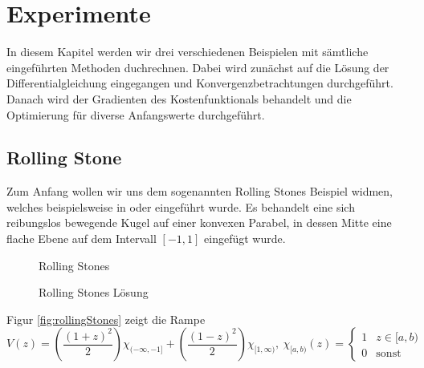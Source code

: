 \chapter{Experimente}
In diesem Kapitel werden wir drei verschiedenen Beispielen mit sämtliche eingeführten Methoden duchrechnen. Dabei wird zunächst auf die Lösung der Differentialgleichung eingegangen und Konvergenzbetrachtungen durchgeführt. Danach wird der Gradienten des Kostenfunktionals behandelt und die Optimierung für diverse Anfangswerte durchgeführt. %
\section{Rolling Stone}
Zum Anfang wollen wir uns dem sogenannten Rolling Stones Beispiel widmen, welches beispielsweise in \cite{boeck2014experiments} oder \cite{hasenfelder13} eingeführt wurde. 
Es behandelt eine sich reibungslos bewegende Kugel auf einer konvexen Parabel, in dessen Mitte eine flache Ebene auf dem Intervall $[-1,1]$ eingefügt wurde. 
\begin{figure}[ht]
\centering
\begin{minipage}[b]{0.49\linewidth}

\caption{Rolling Stones}
\label{fig:rollingStones}
\end{minipage}
\begin{minipage}[b]{0.49\linewidth}

\caption{Rolling Stones Lösung}
\label{fig:rollingStonesSolution}
\end{minipage}
\end{figure}
Figur \ref{fig:rollingStones} zeigt die Rampe
\[
 V(z) = \left(\frac{(1+z)^2}{2}\right)\chi_{(-\infty,-1]} + \left(\frac{(1-z)^2}{2}\right)\chi_{[1,\infty)} ,
 ~ \chi_{[a,b)}(z) = 
 \begin{cases}
  1 & z \in [a,b)\\
  0 & \text{sonst}
 \end{cases}
\]

